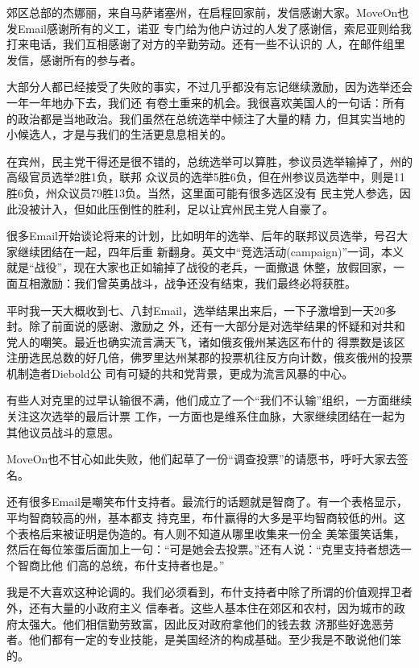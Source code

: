 ﻿\documentclass[11pt]{article}
\begin{document}
郊区总部的杰娜丽，来自马萨诸塞州，在启程回家前，发信感谢大家。MoveOn也发Email感谢所有的义工，诺亚
专门给为他户访过的人发了感谢信，索尼亚则给我打来电话，我们互相感谢了对方的辛勤劳动。还有一些不认识的
人，在邮件组里发信，感谢所有的参与者。


大部分人都已经接受了失败的事实，不过几乎都没有忘记继续激励，因为选举还会一年一年地办下去，我们还
有卷土重来的机会。我很喜欢美国人的一句话：所有的政治都是当地政治。我们虽然在总统选举中倾注了大量的精
力，但其实当地的小候选人，才是与我们的生活更息息相关的。

在宾州，民主党干得还是很不错的，总统选举可以算胜，参议员选举输掉了，州的高级官员选举2胜1负，联邦
众议员的选举5胜6负，但在州参议员选举中，则是11胜6负，州众议员79胜13负。当然，这里面可能有很多选区没有
民主党人参选，因此没被计入，但如此压倒性的胜利，足以让宾州民主党人自豪了。

很多Email开始谈论将来的计划，比如明年的选举、后年的联邦议员选举，号召大家继续团结在一起，四年后重
新翻身。英文中``竞选活动(campaign)''一词，本义就是``战役''，现在大家也正如输掉了战役的老兵，一面撤退
休整，放假回家，一面互相激励：我们曾英勇战斗，战争还没有结束，我们最终必将获胜。

平时我一天大概收到七、八封Email，选举结果出来后，一下子激增到一天20多封。除了前面说的感谢、激励之
外，还有一大部分是对选举结果的怀疑和对共和党人的嘲笑。最近也确实流言满天飞，诸如俄亥俄州某选区布什的
得票数是该区注册选民总数的好几倍，佛罗里达州某郡的投票机往反方向计数，俄亥俄州的投票机制造者Diebold公
司有可疑的共和党背景，更成为流言风暴的中心。

有些人对克里的过早认输很不满，他们成立了一个``我们不认输''组织，一方面继续关注这次选举的最后计票
工作，一方面也是维系住血脉，大家继续团结在一起为其他议员战斗的意思。

MoveOn也不甘心如此失败，他们起草了一份``调查投票''的请愿书，呼吁大家去签名。

还有很多Email是嘲笑布什支持者。最流行的话题就是智商了。有一个表格显示，平均智商较高的州，基本都支
持克里，布什赢得的大多是平均智商较低的州。这个表格后来被证明是伪造的。有人则不知道从哪里收集来一份全
美笨蛋笑话集，然后在每位笨蛋后面加上一句：``可是她会去投票。''还有人说：``克里支持者想选一个智商比他
们高的总统，布什支持者也是。''

我是不大喜欢这种论调的。我们必须看到，布什支持者中除了所谓的价值观捍卫者外，还有大量的小政府主义
信奉者。这些人基本住在郊区和农村，因为城市的政府太强大。他们相信勤劳致富，因此反对政府拿他们的钱去救
济那些好逸恶劳者。他们都有一定的专业技能，是美国经济的构成基础。至少我是不敢说他们笨的。
\end{document}
